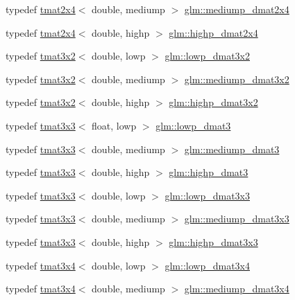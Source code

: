 \begin{DoxyCompactItemize}
typedef \hyperlink{structglm_1_1tmat2x4}{tmat2x4}$<$ double, mediump $>$ \hyperlink{group__core__precision_ga837b8ead9807e10740dddfc99dabe8d7}{glm\+::mediump\+\_\+dmat2x4}
\item 
typedef \hyperlink{structglm_1_1tmat2x4}{tmat2x4}$<$ double, highp $>$ \hyperlink{group__core__precision_ga2b1bf87a8f8fbc895127c6bfde7a271e}{glm\+::highp\+\_\+dmat2x4}
\item 
typedef \hyperlink{structglm_1_1tmat3x2}{tmat3x2}$<$ double, lowp $>$ \hyperlink{group__core__precision_gac90dba962673ae315e5504a362d39b1c}{glm\+::lowp\+\_\+dmat3x2}
\item 
typedef \hyperlink{structglm_1_1tmat3x2}{tmat3x2}$<$ double, mediump $>$ \hyperlink{group__core__precision_ga5ad217fad4f08abe72401409595076f2}{glm\+::mediump\+\_\+dmat3x2}
\item 
typedef \hyperlink{structglm_1_1tmat3x2}{tmat3x2}$<$ double, highp $>$ \hyperlink{group__core__precision_gafe7ef85b0bc26e754cbf83fed54bf106}{glm\+::highp\+\_\+dmat3x2}
\item 
typedef \hyperlink{structglm_1_1tmat3x3}{tmat3x3}$<$ float, lowp $>$ \hyperlink{group__core__precision_ga2a63ac35bb66e49374db9f699bef9597}{glm\+::lowp\+\_\+dmat3}
\item 
typedef \hyperlink{structglm_1_1tmat3x3}{tmat3x3}$<$ double, mediump $>$ \hyperlink{group__core__precision_ga1a9a878d256cbb899a9c10bc7332995a}{glm\+::mediump\+\_\+dmat3}
\item 
typedef \hyperlink{structglm_1_1tmat3x3}{tmat3x3}$<$ double, highp $>$ \hyperlink{group__core__precision_gafa89ae412491446e508782ddd9bc55c7}{glm\+::highp\+\_\+dmat3}
\item 
typedef \hyperlink{structglm_1_1tmat3x3}{tmat3x3}$<$ double, lowp $>$ \hyperlink{group__core__precision_ga8cc302ca16a2ae1708143c85d50de0e7}{glm\+::lowp\+\_\+dmat3x3}
\item 
typedef \hyperlink{structglm_1_1tmat3x3}{tmat3x3}$<$ double, mediump $>$ \hyperlink{group__core__precision_ga7c4e98b7bf5674658ba5e0892e9bf531}{glm\+::mediump\+\_\+dmat3x3}
\item 
typedef \hyperlink{structglm_1_1tmat3x3}{tmat3x3}$<$ double, highp $>$ \hyperlink{group__core__precision_ga604f966e7bf042f298beb3b262287970}{glm\+::highp\+\_\+dmat3x3}
\item 
typedef \hyperlink{structglm_1_1tmat3x4}{tmat3x4}$<$ double, lowp $>$ \hyperlink{group__core__precision_gadbca772b626928af301ea079903ee5d9}{glm\+::lowp\+\_\+dmat3x4}
\item 
typedef \hyperlink{structglm_1_1tmat3x4}{tmat3x4}$<$ double, mediump $>$ \hyperlink{group__core__precision_ga38bf4080b5b7d9ecc1fdbe2932511e4b}{glm\+::mediump\+\_\+dmat3x4}

\end{DoxyCompactItemize}
